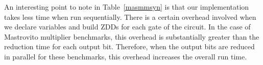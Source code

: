 \par An interesting point to note in Table~\ref{masmmsyn} is that
our implementation takes less time when run
sequentially. There is a certain overhead involved when we declare
variables and build ZDDs for each gate of the circuit. In the case of
Mastrovito multiplier benchmarks, this overhead is substantially
greater than the reduction time for each output bit. Therefore, when
the output bits are reduced in parallel for these benchmarks, 
this overhead increases the overall run time.  
 


